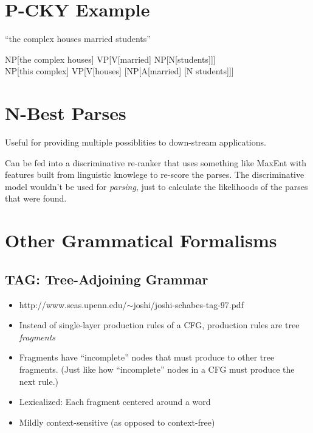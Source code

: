 \documentclass[11pt,letterpaper]{article}
\begin{document}
\section{P-CKY Example}

``the complex houses married students''

NP[the complex houses] VP[V[married] NP[N[students]]] \\
NP[this complex] VP[V[houses] [NP[A[married] [N students]]]
 


\section{N-Best Parses}

Useful for providing multiple possiblities to down-stream applications.

Can be fed into a discriminative re-ranker that uses something like MaxEnt with features built from linguistic knowlege to re-score the parses.  The discriminative model wouldn't be used for \textit{parsing}, just to calculate the likelihoods of the parses that were found.




\section{Other Grammatical Formalisms}

\subsection{TAG: Tree-Adjoining Grammar}

\begin{itemize}
  \item http://www.seas.upenn.edu/$\sim$joshi/joshi-schabes-tag-97.pdf
  \item Instead of single-layer production rules of a CFG, production rules are tree \textit{fragments}
  \item Fragments have ``incomplete'' nodes that must produce to other tree fragments. (Just like how ``incomplete'' nodes in a CFG must produce the next rule.)
  \item Lexicalized: Each fragment centered around a word
  \item Mildly context-sensitive (as opposed to context-free)
\end{itemize}
\end{document}
